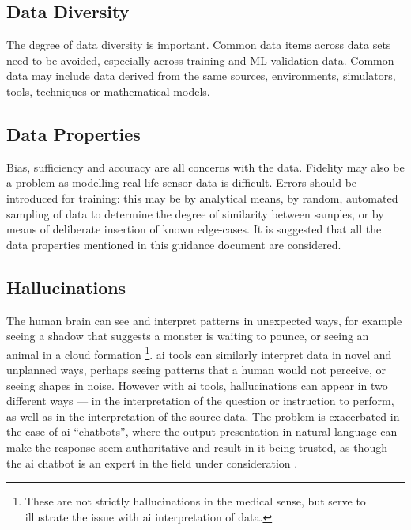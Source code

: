\subsection{Data Diversity}
The degree of data diversity is important. Common data items across data sets need to be avoided, especially across training and
ML
validation data. Common data may include data derived from the same sources, environments, simulators, tools, techniques or mathematical models.

\subsection{Data Properties}
Bias, sufficiency and accuracy are all concerns with the data. Fidelity may also be a problem as modelling real-life sensor data is difficult.  Errors should be introduced for training: this may be by analytical means, by random, automated sampling of data to determine the degree of similarity between samples, or by means of deliberate insertion of known edge-cases. 
It is suggested that all the data properties mentioned in this guidance document are considered.

\subsection{Hallucinations}
\label{bkm:MachineLearning:Hallucinations}
%
The human brain can see and interpret patterns in unexpected ways, for example seeing a shadow that
suggests a monster is waiting to pounce, or seeing an animal in a cloud formation%
\footnote{These are not strictly hallucinations in the medical sense, but serve to illustrate
the issue with \gls{ai} interpretation of data.}.
\Gls{ai} tools can similarly interpret data in novel and unplanned ways, perhaps seeing patterns that a
human would not perceive, or seeing shapes in noise. However with \gls{ai} tools, hallucinations can appear
in two different ways --- in the interpretation of the question or instruction to perform, as well as
in the interpretation of the source data.
The problem is exacerbated in the case of \gls{ai} ``chatbots'', where the output presentation in natural
language can make the response seem authoritative and result in it being trusted, as though the
\gls{ai} chatbot is an expert in the field under consideration \cite{citation:chatbotsterrible:website}. 

